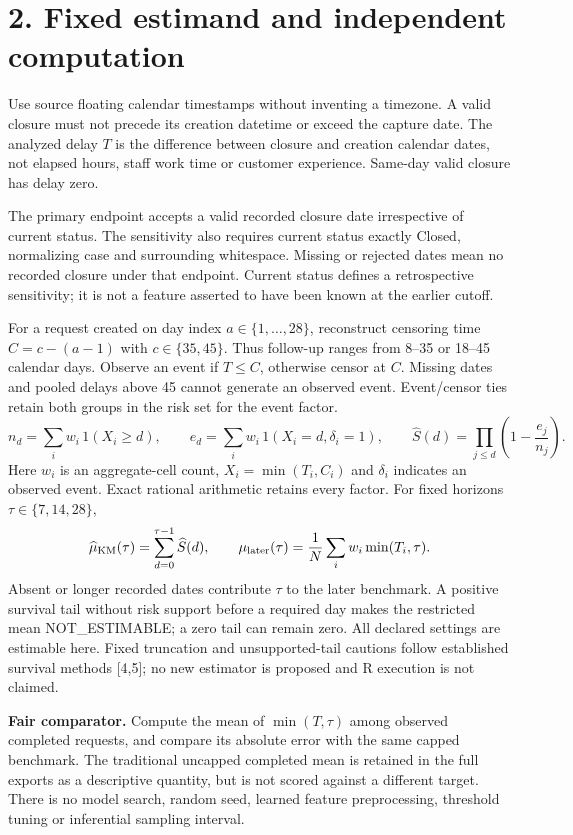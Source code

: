 \documentclass[10pt,letterpaper]{article}
\begin{document}
\clearpage
\section*{2. Fixed estimand and independent computation}
Use source floating calendar timestamps without inventing a timezone. A valid closure must not precede its creation datetime or exceed the capture date. The analyzed delay $T$ is the difference between closure and creation calendar dates, not elapsed hours, staff work time or customer experience. Same-day valid closure has delay zero.

The primary endpoint accepts a valid recorded closure date irrespective of current status. The sensitivity also requires current status exactly Closed, normalizing case and surrounding whitespace. Missing or rejected dates mean no recorded closure under that endpoint. Current status defines a retrospective sensitivity; it is not a feature asserted to have been known at the earlier cutoff.

For a request created on day index $a\in\{1,\ldots,28\}$, reconstruct censoring time $C=c-(a-1)$ with $c\in\{35,45\}$. Thus follow-up ranges from 8--35 or 18--45 calendar days. Observe an event if $T\leq C$, otherwise censor at $C$. Missing dates and pooled delays above 45 cannot generate an observed event. Event/censor ties retain both groups in the risk set for the event factor.
\[
n_d=\sum_i w_i\,1(X_i\geq d),\qquad
e_d=\sum_i w_i\,1(X_i=d,\delta_i=1),\qquad
\widehat S(d)=\prod_{j\leq d}\left(1-\frac{e_j}{n_j}\right).
\]
Here $w_i$ is an aggregate-cell count, $X_i=\min(T_i,C_i)$ and $\delta_i$ indicates an observed event. Exact rational arithmetic retains every factor. For fixed horizons $\tau\in\{7,14,28\}$,
\[
\widehat\mu_{\rm KM}(\tau)=\sum_{d=0}^{\tau-1}\widehat S(d),\qquad
\mu_{\rm later}(\tau)=\frac{1}{N}\sum_i w_i\min(T_i,\tau).
\]
Absent or longer recorded dates contribute $\tau$ to the later benchmark. A positive survival tail without risk support before a required day makes the restricted mean NOT\_ESTIMABLE; a zero tail can remain zero. All declared settings are estimable here. Fixed truncation and unsupported-tail cautions follow established survival methods [4,5]; no new estimator is proposed and R execution is not claimed.

\textbf{Fair comparator.} Compute the mean of $\min(T,\tau)$ among observed completed requests, and compare its absolute error with the same capped benchmark. The traditional uncapped completed mean is retained in the full exports as a descriptive quantity, but is not scored against a different target. There is no model search, random seed, learned feature preprocessing, threshold tuning or inferential sampling interval.
\end{document}
